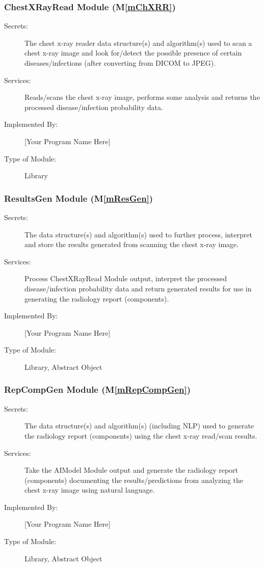 \documentclass[12pt, titlepage]{article}
\newcommand{\mref}[1]{M\ref{#1}}
\begin{document}
\subsubsection{ChestXRayRead Module (\mref{mChXRR})}

\begin{description}
\item[Secrets:] The chest x-ray reader data structure(s) and algorithm(s)
  used to scan a chest x-ray image and look for/detect the possible presence
  of certain diseases/infections (after converting from DICOM to JPEG).
\item[Services:] Reads/scans the chest x-ray image, performs some analysis and
  returns the processed disease/infection probability data.
\item[Implemented By:] [Your Program Name Here]
\item[Type of Module:] Library
\end{description}

\subsubsection{ResultsGen Module (\mref{mResGen})}

\begin{description}
\item[Secrets:] The data structure(s) and algorithm(s) used to further
  process, interpret and store the results generated from scanning the chest
  x-ray image.
\item[Services:] Process ChestXRayRead Module output, interpret the processed
  disease/infection probability data and return generated results for use in
  generating the radiology report (components).
\item[Implemented By:] [Your Program Name Here]
\item[Type of Module:] Library, Abstract Object
\end{description}

\subsubsection{RepCompGen Module (\mref{mRepCompGen})}

\begin{description}
\item[Secrets:] The data structure(s) and algorithm(s) (including NLP) used to
  generate the radiology report (components) using the chest x-ray read/scan
  results.
\item[Services:] Take the AIModel Module output and generate the radiology
  report (components) documenting the results/predictions from analyzing the
  chest x-ray image using natural language.
\item[Implemented By:] [Your Program Name Here]
\item[Type of Module:] Library, Abstract Object
\end{description}
\end{document}
